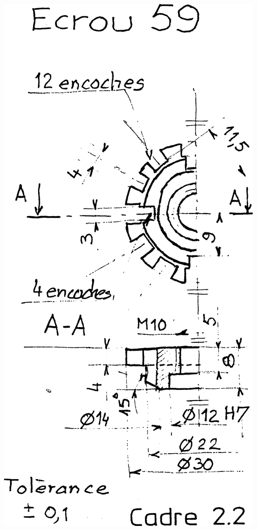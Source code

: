 \documentclass[11pt,oneside]{article}
\begin{document}
\begin{minipage}[c]{.35\linewidth}
\begin{center}
\includegraphics[width=.95\textwidth]{png/59}
\end{center}
\end{minipage} \hfill
\end{document}
